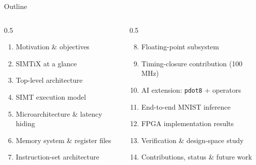 \documentclass[aspectratio=169,11pt]{beamer}
\begin{document}
\begin{frame}{Outline}
  \begin{columns}[T]
    \begin{column}{0.5\textwidth}
      \begin{enumerate}
        \item Motivation \& objectives
        \item SIMTiX at a glance
        \item Top-level architecture
        \item SIMT execution model
        \item Microarchitecture \& latency hiding
        \item Memory system \& register files
        \item Instruction-set architecture
      \end{enumerate}
    \end{column}
    \begin{column}{0.5\textwidth}
      \begin{enumerate}
        \setcounter{enumi}{7}
        \item Floating-point subsystem
        \item Timing-closure contribution (100\,MHz)
        \item AI extension: \texttt{pdot8} + operators
        \item End-to-end MNIST inference
        \item FPGA implementation results
        \item Verification \& design-space study
        \item Contributions, status \& future work
      \end{enumerate}
    \end{column}
  \end{columns}
\end{frame}
\end{document}
